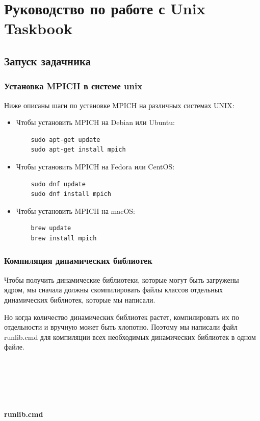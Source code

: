 \section{Руководство по работе с Unix Taskbook}

\subsection{Запуск задачника}

\subsubsection{Установка MPICH в системе unix}
Ниже описаны шаги по установке MPICH на различных системах UNIX:

\begin{itemize}
    \item Чтобы установить MPICH на Debian или Ubuntu:
    \lstset{language=bash}
    \begin{lstlisting}
    sudo apt-get update
    sudo apt-get install mpich
    \end{lstlisting}
    \item Чтобы установить MPICH на Fedora или CentOS:
    \lstset{language=bash}
    \begin{lstlisting}
    sudo dnf update
    sudo dnf install mpich
    \end{lstlisting}
    \item Чтобы установить MPICH на macOS:
    \begin{lstlisting}
    brew update
    brew install mpich        
    \end{lstlisting}
\end{itemize}

\subsubsection{Компиляция динамических библиотек}

Чтобы получить динамические библиотеки, которые могут быть загружены ядром, мы 
сначала должны скомпилировать файлы классов отдельных динамических библиотек, которые мы написали.

Но когда количество динамических библиотек растет, компилировать их по отдельности и 
вручную может быть хлопотно. Поэтому мы написали файл runlib.cmd для компиляции всех 
необходимых динамических библиотек в одном файле.
\\ \\ \\  \\ \\ \\ 
\centerline{\textbf{runlib.cmd}}

